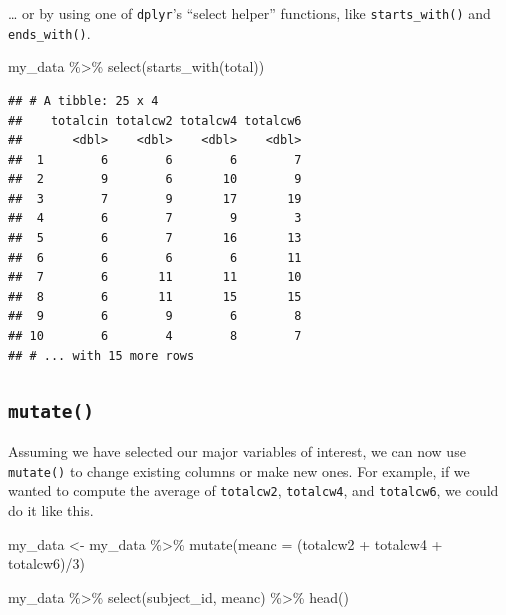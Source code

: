 \documentclass[
]{book}
\newenvironment{Shaded}{\begin{snugshade}}{\end{snugshade}}
\newcommand{\AttributeTok}[1]{\textcolor[rgb]{0.77,0.63,0.00}{#1}}
\newcommand{\DecValTok}[1]{\textcolor[rgb]{0.00,0.00,0.81}{#1}}
\newcommand{\FunctionTok}[1]{\textcolor[rgb]{0.00,0.00,0.00}{#1}}
\newcommand{\NormalTok}[1]{#1}
\newcommand{\OtherTok}[1]{\textcolor[rgb]{0.56,0.35,0.01}{#1}}
\newcommand{\SpecialCharTok}[1]{\textcolor[rgb]{0.00,0.00,0.00}{#1}}
\newcommand{\StringTok}[1]{\textcolor[rgb]{0.31,0.60,0.02}{#1}}
\begin{document}
\ldots{} or by using one of \texttt{dplyr}'s ``select helper'' functions, like \texttt{starts\_with()} and \texttt{ends\_with()}.

\begin{Shaded}
\begin{Highlighting}[]
\NormalTok{my\_data }\SpecialCharTok{\%\textgreater{}\%} 
  \FunctionTok{select}\NormalTok{(}\FunctionTok{starts\_with}\NormalTok{(}\StringTok{\textquotesingle{}total\textquotesingle{}}\NormalTok{))}
\end{Highlighting}
\end{Shaded}

\begin{verbatim}
## # A tibble: 25 x 4
##    totalcin totalcw2 totalcw4 totalcw6
##       <dbl>    <dbl>    <dbl>    <dbl>
##  1        6        6        6        7
##  2        9        6       10        9
##  3        7        9       17       19
##  4        6        7        9        3
##  5        6        7       16       13
##  6        6        6        6       11
##  7        6       11       11       10
##  8        6       11       15       15
##  9        6        9        6        8
## 10        6        4        8        7
## # ... with 15 more rows
\end{verbatim}

\hypertarget{mutate}{%
\subsection{\texorpdfstring{\texttt{mutate()}}{mutate()}}\label{mutate}}

Assuming we have selected our major variables of interest, we can now use \texttt{mutate()} to change existing columns or make new ones. For example, if we wanted to compute the average of \texttt{totalcw2}, \texttt{totalcw4}, and \texttt{totalcw6}, we could do it like this.

\begin{Shaded}
\begin{Highlighting}[]
\NormalTok{my\_data }\OtherTok{\textless{}{-}}\NormalTok{ my\_data }\SpecialCharTok{\%\textgreater{}\%} 
  \FunctionTok{mutate}\NormalTok{(}\AttributeTok{meanc =}\NormalTok{ (totalcw2 }\SpecialCharTok{+}\NormalTok{ totalcw4 }\SpecialCharTok{+}\NormalTok{ totalcw6)}\SpecialCharTok{/}\DecValTok{3}\NormalTok{)}

\NormalTok{my\_data }\SpecialCharTok{\%\textgreater{}\%} 
  \FunctionTok{select}\NormalTok{(subject\_id, meanc) }\SpecialCharTok{\%\textgreater{}\%} 
  \FunctionTok{head}\NormalTok{()}
\end{Highlighting}
\end{Shaded}
\end{document}
